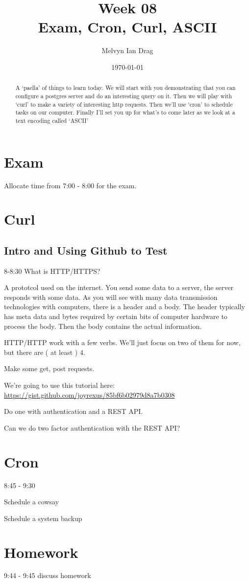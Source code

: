 \documentclass[12pt]{article}
\title{\textbf{Week 08} \\
\Large Exam, Cron, Curl, ASCII}
\author{
	Melvyn Ian Drag
}
\date{\today}
\begin{document}
\maketitle

\begin{abstract}
A `paella' of things to learn today. We will start with you demonstrating that you can configure a postgres server and do an interesting query on it. Then we will play with `curl' to make a variety of interesting http requests. Then we'll use `cron' to schedule tasks on our computer. Finally I'll set you up for what's to come later as we look at a text encoding called `ASCII'
\end{abstract}


\section{Exam}
Allocate time from 7:00 - 8:00 for the exam.

\section{Curl}
\subsection{Intro and Using Github to Test}
8-8:30
What is HTTP/HTTPS?

A prototcol used on the internet. You send some data to a server, the server responds with some data. As you will see with many data transmission technologies with computers, there is a header and a body. The header typically has meta data and bytes required by certain bits of computer hardware to process the body. Then the body contains the actual information.

HTTP/HTTP work with a few verbs. We'll just focus on two of them for now, but there are ( at least ) 4. 

Make some get, post requests. 

We're going to use this tutorial here:
\url{https://gist.github.com/joyrexus/85bf6b02979d8a7b0308}

Do one with authentication and a REST API.

Can we do two factor authentication with the REST API?

\subsection{}

\section{Cron}
8:45 - 9:30

Schedule a cowsay

Schedule a system backup

\section{Homework}
9:44 - 9:45 discuss homework
\end{document}

